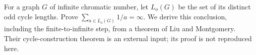 For a graph $G$ of infinite chromatic number, let $L_o(G)$ be the set of its distinct odd cycle lengths. Prove $\sum_{a\in L_o(G)}1/a=\infty$. We derive this conclusion, including the finite-to-infinite step, from a theorem of Liu and Montgomery. Their cycle-construction theorem is an external input; its proof is not reproduced here.

